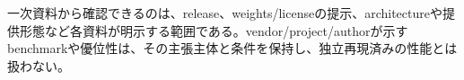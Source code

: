 \begin{claimboundary}
一次資料から確認できるのは、release、weights/licenseの提示、architectureや提供形態など各資料が明示する範囲である。vendor/project/authorが示すbenchmarkや優位性は、その主張主体と条件を保持し、独立再現済みの性能とは扱わない。\autocite{src-8f8555b73e1b}
\end{claimboundary}
